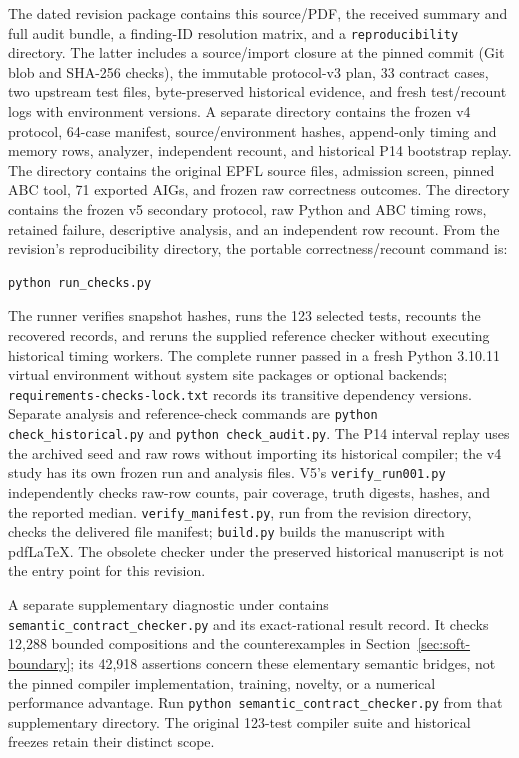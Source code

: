 \documentclass[10pt]{article}
\theoremstyle{plain}
\theoremstyle{definition}
\theoremstyle{remark}
\begin{document}
The dated revision package contains this source/PDF, the received summary and full audit bundle, a finding-ID resolution matrix, and a \texttt{reproducibility} directory. The latter includes a source/import closure at the pinned commit (Git blob and SHA-256 checks), the immutable protocol-v3 plan, 33 contract cases, two upstream test files, byte-preserved historical evidence, and fresh test/recount logs with environment versions. A separate  directory contains the frozen v4 protocol, 64-case manifest, source/environment hashes, append-only timing and memory rows, analyzer, independent recount, and historical P14 bootstrap replay. The  directory contains the original EPFL source files, admission screen, pinned ABC tool, 71 exported AIGs, and frozen raw correctness outcomes. The  directory contains the frozen v5 secondary protocol, raw Python and ABC timing rows, retained failure, descriptive analysis, and an independent row recount. From the revision's reproducibility directory, the portable correctness/recount command is:
\begin{lstlisting}
python run_checks.py
\end{lstlisting}
The runner verifies snapshot hashes, runs the 123 selected tests, recounts the recovered records, and reruns the supplied reference checker without executing historical timing workers. The complete runner passed in a fresh Python 3.10.11 virtual environment without system site packages or optional backends; \texttt{requirements-checks-lock.txt} records its transitive dependency versions. Separate analysis and reference-check commands are \texttt{python check\_historical.py} and \texttt{python check\_audit.py}. The P14 interval replay uses the archived seed and raw rows without importing its historical compiler; the v4 study has its own frozen run and analysis files. V5's \texttt{verify\_run001.py} independently checks raw-row counts, pair coverage, truth digests, hashes, and the reported median. \texttt{verify\_manifest.py}, run from the revision directory, checks the delivered file manifest; \texttt{build.py} builds the manuscript with pdfLaTeX. The obsolete checker under the preserved historical manuscript is not the entry point for this revision.

A separate supplementary diagnostic under  contains \texttt{semantic\_contract\_checker.py} and its exact-rational result record. It checks 12,288 bounded compositions and the counterexamples in Section~\ref{sec:soft-boundary}; its 42,918 assertions concern these elementary semantic bridges, not the pinned compiler implementation, training, novelty, or a numerical performance advantage. Run \texttt{python semantic\_contract\_checker.py} from that supplementary directory. The original 123-test compiler suite and historical freezes retain their distinct scope.
\end{document}
